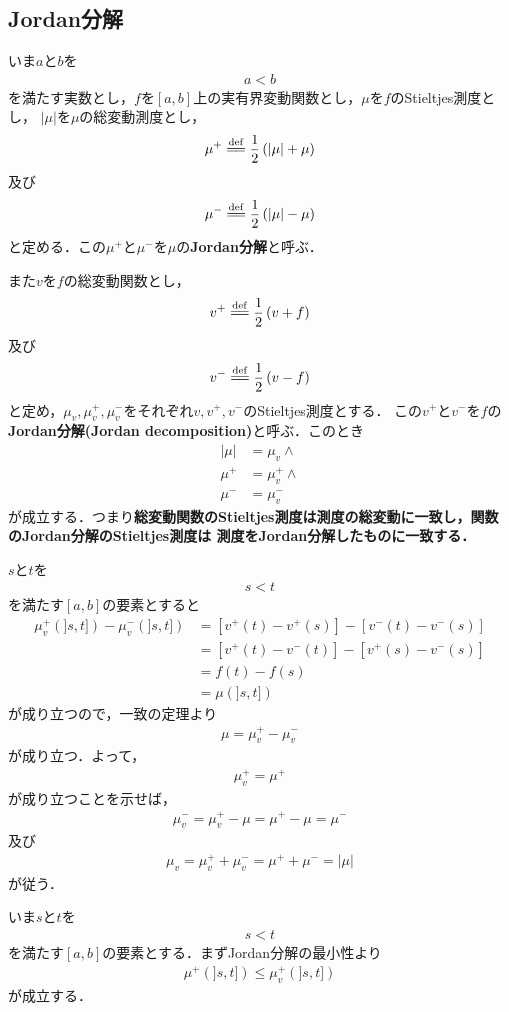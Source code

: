 \subsection{Jordan分解}
	いま$a$と$b$を
	\begin{align}
		a < b
	\end{align}
	を満たす実数とし，$f$を$[a,b]$上の実有界変動関数とし，$\mu$を$f$のStieltjes測度とし，
	$|\mu|$を$\mu$の総変動測度とし，
	\begin{align}
		\mu^{+} \defeq \frac{1}{2}\left(|\mu| + \mu\right)
	\end{align}
	及び
	\begin{align}
		\mu^{-} \defeq \frac{1}{2}\left(|\mu| - \mu\right)
	\end{align}
	と定める．この$\mu^{+}$と$\mu^{-}$を$\mu$の{\bf Jordan分解}と呼ぶ．
	
	また$v$を$f$の総変動関数とし，
	\begin{align}
		v^{+} \defeq \frac{1}{2}\left(v + f\right)
	\end{align}
	及び
	\begin{align}
		v^{-} \defeq \frac{1}{2}\left(v - f\right)
	\end{align}
	と定め，$\mu_{v},\mu_{v}^{+},\mu_{v}^{-}$をそれぞれ$v,v^{+},v^{-}$のStieltjes測度とする．
	この$v^{+}$と$v^{-}$を$f$の{\bf Jordan分解}{\bf (Jordan decomposition)}と呼ぶ．このとき
	\begin{align}
		|\mu| &= \mu_{v} \wedge \\
		\mu^{+} &= \mu_{v}^{+} \wedge \\
		\mu^{-} &= \mu_{v}^{-}
		\label{fom:Jordan_decompositions_of_measure_and_function_coincide}
	\end{align}
	が成立する．つまり{\bf 総変動関数のStieltjes測度は測度の総変動に一致し，関数のJordan分解のStieltjes測度は
	測度をJordan分解したものに一致する．}
	
	$s$と$t$を
	\begin{align}
		s < t
	\end{align}
	を満たす$[a,b]$の要素とすると
	\begin{align}
		\mu_{v}^{+}(]s,t]) - \mu_{v}^{-}(]s,t])
		&= [v^{+}(t) - v^{+}(s)] - [v^{-}(t) - v^{-}(s)] \\
		&= [v^{+}(t) - v^{-}(t)] - [v^{+}(s) - v^{-}(s)] \\
		&= f(t) - f(s) \\
		&= \mu(]s,t])
	\end{align}
	が成り立つので，一致の定理より
	\begin{align}
		\mu = \mu_{v}^{+} - \mu_{v}^{-}
	\end{align}
	が成り立つ．よって，
	\begin{align}
		\mu_{v}^{+} = \mu^{+}
	\end{align}
	が成り立つことを示せば，
	\begin{align}
		\mu_{v}^{-} = \mu_{v}^{+} - \mu = \mu^{+} - \mu = \mu^{-}
	\end{align}
	及び
	\begin{align}
		\mu_{v} = \mu_{v}^{+} + \mu_{v}^{-} = \mu^{+} + \mu^{-} = |\mu|
	\end{align}
	が従う．
	
	いま$s$と$t$を
	\begin{align}
		s < t
	\end{align}
	を満たす$[a,b]$の要素とする．まずJordan分解の最小性より
	\begin{align}
		\mu^{+}(]s,t]) \leq \mu_{v}^{+}(]s,t])
	\end{align}
	が成立する．